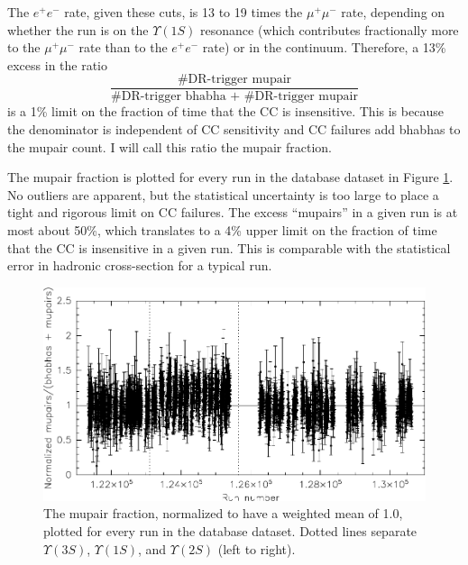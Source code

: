 The $e^+e^-$ rate, given these cuts, is 13 to 19 times the
$\mu^+\mu^-$ rate, depending on whether the run is on the
$\Upsilon(1S)$ resonance (which contributes fractionally more to the
$\mu^+\mu^-$ rate than to the $e^+e^-$ rate) or in the continuum.
Therefore, a 13\% excess in the ratio
\begin{equation}
  \frac{\mbox{\#DR-trigger mupair}}{\mbox{\#DR-trigger bhabha +
  \#DR-trigger mupair}}
\end{equation}
is a 1\% limit on the fraction of time that the CC is insensitive.
This is because the denominator is independent of CC sensitivity and
CC failures add bhabhas to the mupair count.  I will call this ratio
the mupair fraction.

The mupair fraction is plotted for every run in the database dataset
in Figure \ref{runbyrun_bhamutt}.  No outliers are apparent, but the
statistical uncertainty is too large to place a tight and rigorous
limit on CC failures.  The excess ``mupairs'' in a given run is at
most about 50\%, which translates to a 4\% upper limit on the fraction
of time that the CC is insensitive in a given run.  This is comparable
with the statistical error in hadronic cross-section for a typical
run.

\begin{figure}[p]
  \includegraphics[width=\linewidth]{plots/runbyrun_bhamutt}
  \caption{\label{runbyrun_bhamutt} The mupair fraction, normalized to
  have a weighted mean of 1.0, plotted for every run in the database
  dataset.  Dotted lines separate $\Upsilon(3S)$, $\Upsilon(1S)$, and
  $\Upsilon(2S)$ (left to right).}
\end{figure}

